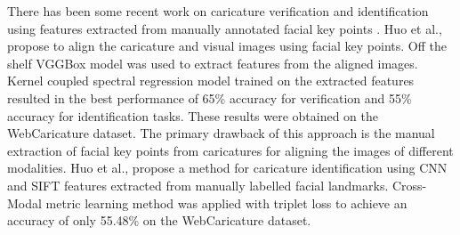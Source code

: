 There has been some recent work on caricature verification and identification using features extracted from manually annotated facial key points  \cite{rw5} \cite{newWebCari_Paper}. Huo et al., \cite{rw5} propose to align the caricature and visual images using facial key points. Off the shelf VGGBox model was used to extract features from the aligned images. Kernel coupled spectral regression model trained on the extracted features resulted in the best performance of 65\% accuracy for verification and 55\% accuracy for identification tasks. These results were obtained on the WebCaricature dataset. The primary drawback of this approach is the manual extraction of facial key points from caricatures for aligning the images of different modalities. Huo et al., \cite {newWebCari_Paper} propose a method for caricature identification using CNN and SIFT features extracted from manually labelled facial landmarks. Cross-Modal metric learning method was applied with triplet loss to achieve an accuracy of only 55.48\% on the WebCaricature dataset. 



